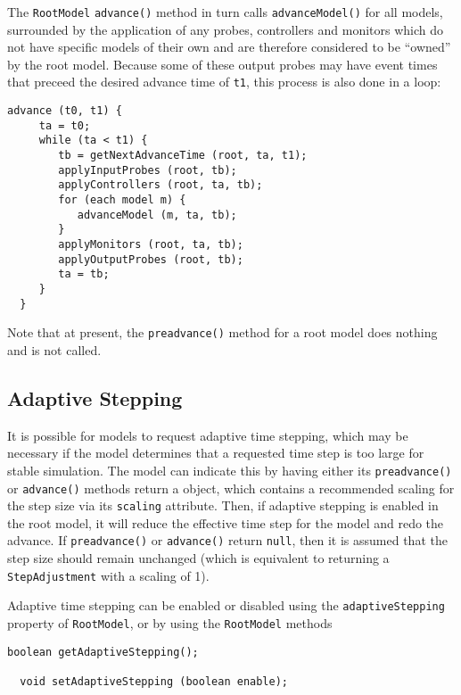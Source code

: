 \documentclass{article}
\begin{document}
The {\tt RootModel} {\tt advance()} method in turn calls {\tt advanceModel()}
for all models, surrounded by the application of any
probes, controllers and monitors which do not have specific models of
their own and are therefore considered to be ``owned'' by the root
model. Because some of these output probes may have event
times that preceed the desired advance time of {\tt t1}, this process
is also done in a loop:
\begin{lstlisting}[]
  advance (t0, t1) {
     ta = t0;
     while (ta < t1) {
        tb = getNextAdvanceTime (root, ta, t1);
        applyInputProbes (root, tb);
        applyControllers (root, ta, tb);
        for (each model m) {
           advanceModel (m, ta, tb);
        }
        applyMonitors (root, ta, tb);
        applyOutputProbes (root, tb);
        ta = tb;
     }
  }
\end{lstlisting}

Note that at present, the {\tt preadvance()} method for a root model
does nothing and is not called.

\subsection{Adaptive Stepping}
\label{AdaptiveSteppingSec}

It is possible for models to request adaptive time stepping, which may
be necessary if the model determines that a requested time step is too
large for stable simulation. The model can indicate this by having
either its {\tt preadvance()} or {\tt advance()} methods return a
 object, which
contains a recommended scaling for the step size via its {\tt scaling}
attribute.  Then, if adaptive stepping is enabled in the root model,
it will reduce the effective time step for the model and redo the
advance.  If {\tt preadvance()} or {\tt advance()} return {\tt null},
then it is assumed that the step size should remain unchanged (which
is equivalent to returning a {\tt StepAdjustment} with a scaling of
1).

Adaptive time stepping can be enabled or disabled using the {\tt adaptiveStepping}
property of {\tt RootModel}, or by using the {\tt RootModel} methods
\begin{lstlisting}[]
  boolean getAdaptiveStepping();

  void setAdaptiveStepping (boolean enable);
\end{lstlisting}
\end{document}
